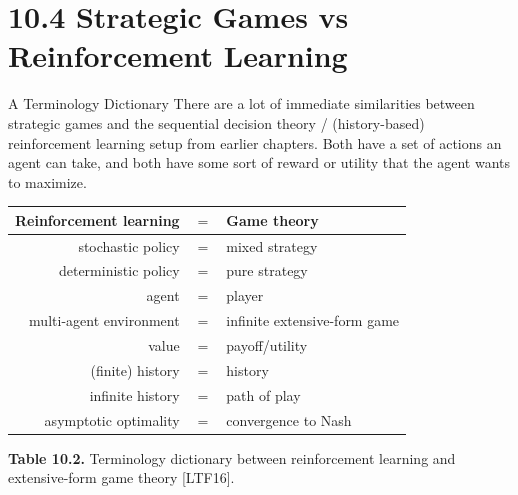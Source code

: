 \documentclass[aspectratio=169,10pt]{beamer}
\begin{document}
\section{10.4 Strategic Games vs Reinforcement Learning}

\begin{frame}{A Terminology Dictionary}
  There are a lot of immediate similarities between strategic games and
  the sequential decision theory / (history-based) reinforcement learning
  setup from earlier chapters. Both have a set of actions an agent can
  take, and both have some sort of reward or utility that the agent wants
  to maximize.

  \begin{center}
  \begin{tabular}{r c l}
    \toprule
    \textbf{Reinforcement learning} & $=$ & \textbf{Game theory} \\
    \midrule
    stochastic policy & $=$ & mixed strategy \\
    deterministic policy & $=$ & pure strategy \\
    agent & $=$ & player \\
    multi-agent environment & $=$ & infinite extensive-form game \\
    value & $=$ & payoff/utility \\
    (finite) history & $=$ & history \\
    infinite history & $=$ & path of play \\
    \midrule
    asymptotic optimality & $=$ & convergence to Nash \\
    \bottomrule
  \end{tabular}
  \end{center}
  \textbf{Table 10.2.} Terminology dictionary between reinforcement
  learning and extensive-form game theory {\footnotesize[LTF16]}.
\end{frame}
\end{document}
